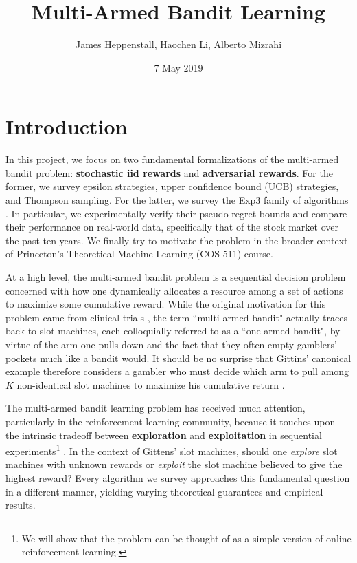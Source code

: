 \documentclass[12pt]{article}
\title{Multi-Armed Bandit Learning}
\author{James Heppenstall, Haochen Li, Alberto Mizrahi}
\date{7 May 2019}
\begin{document}
\maketitle

\section{Introduction}

In this project, we focus on two fundamental formalizations of the multi-armed bandit problem: \textbf{stochastic iid rewards} and \textbf{adversarial rewards}. For the former, we survey epsilon strategies, upper confidence bound (UCB) strategies, and Thompson sampling. For the latter, we survey the Exp3 family of algorithms \cite{ThomsonTutorial}. In particular, we experimentally verify their pseudo-regret bounds and compare their performance on real-world data, specifically that of the stock market over the past ten years. We finally try to motivate the problem in the broader context of Princeton's Theoretical Machine Learning (COS 511) course.

At a high level, the multi-armed bandit problem is a sequential decision problem concerned with how one dynamically allocates a resource among a set of actions to maximize some cumulative reward. While the original motivation for this problem came from clinical trials \cite{thompson}, the term ``multi-armed bandit" actually traces back to slot machines, each colloquially referred to as a ``one-armed bandit", by virtue of the arm one pulls down and the fact that they often empty gamblers' pockets much like a bandit would. It should be no surprise that Gittins' canonical example therefore considers a gambler who must decide which arm to pull among $K$ non-identical slot machines to maximize his cumulative return \cite{gittins}.

The multi-armed bandit learning problem has received much attention, particularly in the reinforcement learning community, because it touches upon the intrinsic tradeoff between \textbf{exploration} and \textbf{exploitation} in sequential experiments\footnote{We will show that the problem can be thought of as a simple version of online reinforcement learning.} \cite{bubeck}. In the context of Gittens' slot machines, should one \textit{explore} slot machines with unknown rewards or \textit{exploit} the slot machine believed to give the highest reward? Every algorithm we survey approaches this fundamental question in a different manner, yielding varying theoretical guarantees and empirical results.
\end{document}
